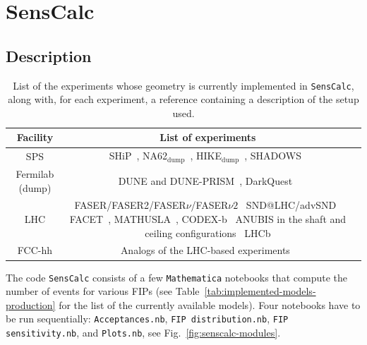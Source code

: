 \documentclass[
    aps,prd,
    twocolumn,
    nofootinbib,
    superscriptaddress,
]{revtex4}
\begin{document}
\section{SensCalc}
\label{sec:senscalc}

\subsection{Description}
\label{sec:description}

\begin{table}
    \centering
    \begin{tabular}{|c|c|c|}
    \hline Facility & List of experiments  \\ \hline
       SPS  & SHiP~\cite{Aberle:2839677,Ahdida:2867743}, NA62$_{\text{dump}}$~\cite{CortinaGil:2839661}, HIKE$_{\text{dump}}$~\cite{CortinaGil:2839661,Ahdida:2867743}, SHADOWS~\cite{Alviggi:2839484,Ahdida:2867743} \\ \hline
        Fermilab (dump)     & DUNE and DUNE-PRISM~\cite{DUNE:2021tad}, DarkQuest~\cite{Batell:2020vqn} \\ \hline
        LHC   & \makecell{FASER/FASER2/FASER$\nu$/FASER$\nu 2$~\cite{FASER:2019aik,FASER:2020gpr,Feng:2022inv}\\ SND@LHC/advSND~\cite{SHiP:2020sos,Feng:2022inv}\\  FACET~\cite{Cerci:2021nlb}, MATHUSLA~\cite{MATHUSLA:2022sze}, CODEX-b~\cite{Aielli:2019ivi} \\ ANUBIS in the shaft and ceiling configurations~\cite{Bauer:2019vqk} \\ LHCb}  \\ \hline FCC-hh & Analogs of the LHC-based experiments~\cite{Boyarsky:2022epg} \\ \hline
    \end{tabular}
    \caption{List of the experiments whose geometry is currently implemented in \texttt{SensCalc}, along with, for each experiment, a reference containing a description of the setup used.}
    \label{tab:implemented-experiments}
\end{table}

The code \texttt{SensCalc} consists of a few \texttt{Mathematica} notebooks that compute the number of events for various FIPs (see Table~\ref{tab:implemented-models-production} for the list of the currently available models). Four notebooks have to be run sequentially: \texttt{Acceptances.nb}, \texttt{FIP distribution.nb}, \texttt{FIP sensitivity.nb}, and \texttt{Plots.nb}, see Fig.~\ref{fig:senscalc-modules}.
\end{document}

